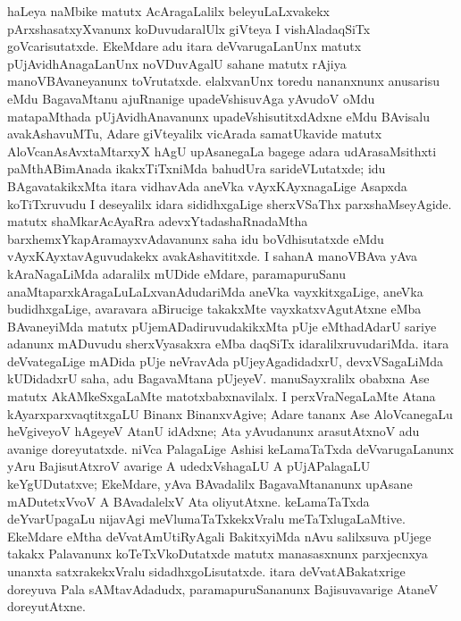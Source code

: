 haLeya naMbike matutx AcAragaLalilx beleyuLaLxvakekx pArxshasatxyXvanunx koDuvudaralUlx giVteya I vishAladaqSiTx goVcarisutatxde. EkeMdare adu itara deVvarugaLanUnx matutx pUjAvidhAnagaLanUnx noVDuvAgalU sahane matutx rAjiya manoVBAvaneyanunx toVrutatxde. elalxvanUnx toredu nananxnunx anusarisu eMdu BagavaMtanu ajuRnanige upadeVshisuvAga  yAvudoV oMdu matapaMthada pUjAvidhAnavanunx upadeVshisutitxdAdxne eMdu BAvisalu avakAshavuMTu, Adare giVteyalilx vicArada samatUkavide matutx AloVcanAsAvxtaMtarxyX hAgU upAsanegaLa bagege adara udArasaMsithxti paMthABimAnada ikakxTiTxniMda bahudUra sarideVLutatxde; idu BAgavatakikxMta itara vidhavAda aneVka vAyxKAyxnagaLige Asapxda koTiTxruvudu I deseyalilx idara sididhxgaLige sherxVSaThx parxshaMseyAgide. matutx shaMkarAcAyaRra adevxYtadashaRnadaMtha barxhemxYkapAramayxvAdavanunx saha idu boVdhisutatxde eMdu vAyxKAyxtavAguvudakekx avakAshavititxde. I sahanA manoVBAva yAva kAraNagaLiMda adaralilx mUDide eMdare, paramapuruSanu anaMtaparxkAragaLuLaLxvanAdudariMda aneVka vayxkitxgaLige, aneVka budidhxgaLige, avaravara aBirucige takakxMte vayxkatxvAgutAtxne eMba BAvaneyiMda matutx pUjemADadiruvudakikxMta pUje eMthadAdarU sariye adanunx mADuvudu sherxVyasakxra eMba daqSiTx idaralilxruvudariMda. itara deVvategaLige mADida pUje neVravAda pUjeyAgadidadxrU, devxVSagaLiMda kUDidadxrU saha, adu BagavaMtana pUjeyeV. manuSayxralilx obabxna Ase matutx AkAMkeSxgaLaMte matotxbabxnavilalx. I perxVraNegaLaMte Atana kAyarxparxvaqtitxgaLU Binanx BinanxvAgive; Adare tananx Ase AloVcanegaLu heVgiveyoV hAgeyeV AtanU idAdxne; Ata yAvudanunx arasutAtxnoV adu avanige doreyutatxde. niVca PalagaLige Ashisi keLamaTaTxda deVvarugaLanunx yAru BajisutAtxroV avarige A udedxVshagaLU A pUjAPalagaLU keYgUDutatxve; EkeMdare, yAva BAvadalilx BagavaMtananunx upAsane mADutetxVvoV A BAvadalelxV Ata oliyutAtxne. keLamaTaTxda deYvarUpagaLu nijavAgi meVlumaTaTxkekxVralu meTaTxlugaLaMtive. EkeMdare eMtha deVvatAmUtiRyAgali BakitxyiMda nAvu salilxsuva pUjege takakx Palavanunx koTeTxVkoDutatxde matutx manasasxnunx parxjecnxya unanxta satxrakekxVralu sidadhxgoLisutatxde. itara deVvatABakatxrige doreyuva Pala sAMtavAdadudx, paramapuruSananunx Bajisuvavarige AtaneV doreyutAtxne.

